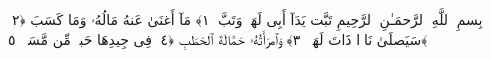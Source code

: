 
  
    
  
    
    

\nopagebreak
  بِسمِ ٱللَّهِ ٱلرَّحمَـٰنِ ٱلرَّحِيمِ
  تَبَّت يَدَآ أَبِى لَهَبٍۢ وَتَبَّ ﴿١﴾
 مَآ أَغنَىٰ عَنهُ مَالُهُۥ وَمَا كَسَبَ ﴿٢﴾
 سَيَصلَىٰ نَارًۭا ذَاتَ لَهَبٍۢ ﴿٣﴾
 وَٱمرَأَتُهُۥ حَمَّالَةَ ٱلحَطَبِ ﴿٤﴾
 فِى جِيدِهَا حَبلٌۭ مِّن مَّسَدٍۭ ﴿٥﴾
 
